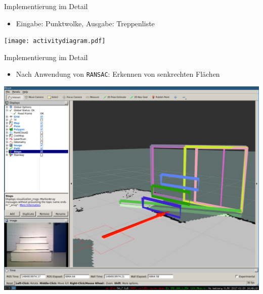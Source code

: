 \documentclass[18pt]{beamer}
\begin{document}
\begin{frame}{Implementierung im Detail}
\begin{itemize}
	\item Eingabe: Punktwolke, Ausgabe: Treppenliste
\end{itemize}
\begin{center}
	\texttt{[image: activitydiagram.pdf]}
\end{center}
\end{frame}

\begin{frame}{Implementierung im Detail}
\begin{itemize}
	\item Nach Anwendung von \texttt{RANSAC}: Erkennen von senkrechten Flächen
\end{itemize}
\begin{center}
	\includegraphics[scale=0.16]{images/ransac01.pdf}
\end{center}
\end{frame}
\end{document}
